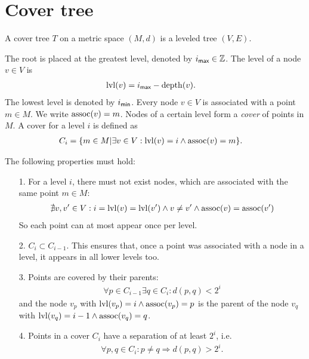 \section{Cover tree}
	\begin{mydef}\label{coverTree}
		A \textnormal{cover tree} $T$ on a metric space $(M, d)$ is a leveled tree $(V, E)$.
		
		The root is placed at the greatest level, denoted by $i_{\textsf{max}} \in \mathbb{Z}$.
		The level of a node $v \in V$ is
		\begin{align*}
			\operatorname{lvl}(v)	&= i_{\textsf{max}} - \operatorname{depth}(v).
		\end{align*}
		The lowest level is denoted by $i_{\textsf{min}}$.
		Every node $v \in V$ is associated with a point $m \in M$. We write $\operatorname{assoc}(v) = m$.
		Nodes of a certain level form a \textit{cover} of points in $M$. A cover for a level $i$ is defined as
		\begin{align*}
			C_i	&= \{m \in M | \exists v \in V : \operatorname{lvl}(v) = i \land \operatorname{assoc}(v) = m\}.
		\end{align*}
		
		The following properties must hold:
		\begin{itemize}
			\item[1.] For a level $i$, there must not exist nodes, which are associated with the same point $m \in M$:
				\begin{align*}
					\nexists v, v' \in V : i = \operatorname{lvl}(v) = \operatorname{lvl}(v') \land v \neq v' \land \operatorname{assoc}(v) = \operatorname{assoc}(v')
				\end{align*}
				So each point can at most appear once per level.
			\item[2.] $C_i \subset C_{i - 1}$. This ensures that, once a point was associated with a node in a
				level, it appears in all lower levels too.
			\item[3.] Points are covered by their parents:
				\begin{align*}
					\forall p \in C_{i - 1} \exists q \in C_{i}: d(p, q) < 2^i
				\end{align*}
				and the node $v_p$ with $\operatorname{lvl}(v_p) = i \land \operatorname{assoc}(v_p) = p$ is the parent of the node
				$v_q$ with $\operatorname{lvl}(v_q) = i - 1 \land \operatorname{assoc}(v_q) = q$.
			\item[4.] Points in a cover $C_i$ have a separation of at least $2^i$, i.e.
				\begin{align*}
					\forall p, q \in C_i : p \neq q \Rightarrow d(p, q) > 2^i.
				\end{align*}
		\end{itemize}
	\end{mydef}
